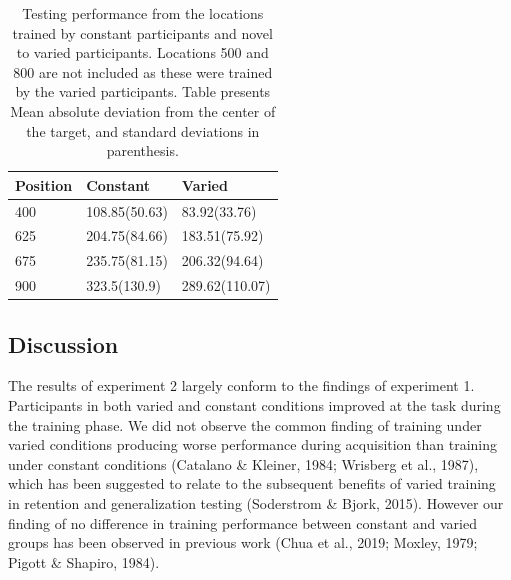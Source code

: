 \documentclass[
  jou, donotrepeattitle,floatsintext]{apa7}
\begin{document}
\begin{table}

\caption{\label{tab:e2tab3}Testing performance from the locations trained by constant participants and novel to varied participants. Locations 500 and 800 are not included as these were trained by the varied participants. Table presents Mean absolute deviation from the center of the target, and standard deviations in parenthesis.}
\begin{tabular}[t]{lll}
\toprule
Position & Constant & Varied\\
\midrule
400 & 108.85(50.63) & 83.92(33.76)\\
625 & 204.75(84.66) & 183.51(75.92)\\
675 & 235.75(81.15) & 206.32(94.64)\\
900 & 323.5(130.9) & 289.62(110.07)\\
\bottomrule
\end{tabular}
\end{table}

\hypertarget{discussion-1}{%
\subsection{Discussion}\label{discussion-1}}

The results of experiment 2 largely conform to the findings of experiment 1. Participants in both varied and constant conditions improved at the task during the training phase. We did not observe the common finding of training under varied conditions producing worse performance during acquisition than training under constant conditions (Catalano \& Kleiner, 1984; Wrisberg et al., 1987), which has been suggested to relate to the subsequent benefits of varied training in retention and generalization testing (Soderstrom \& Bjork, 2015). However our finding of no difference in training performance between constant and varied groups has been observed in previous work (Chua et al., 2019; Moxley, 1979; Pigott \& Shapiro, 1984).
\end{document}
